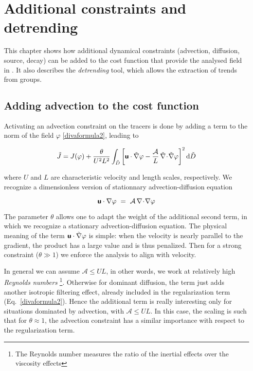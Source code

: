 \chapter{Additional constraints and detrending\label{chap:advection}}

This chapter shows how additional dynamical constraints (advection, diffusion, source, decay) can be added to the cost function that provide the analysed field in \diva. It also describes the \textit{detrending} tool, which allows the extraction of trends from groups.

\minitoc


\section{Adding advection to the cost function}

Activating an advection constraint on the tracers is done by adding a term to the norm of the field $\varphi$ \eqref{divaformula2}, leading to

\begin{equation}
\tilde{J}= J(\varphi) + \frac{\theta}{U^2 L^2} \int_{\tilde{D}}\left[
\mbox{\boldmath $ \protect\mathsf{u} $} \cdot \tilde{\nabla} \varphi
- \frac{\mathcal{A}}{L} \, \tilde{\nabla}\! \cdot\! \tilde{\nabla}\varphi
\right]^2 \mbox{d} \tilde{D}
\end{equation}

where $U$ and $L$ are characteristic velocity and length scales, respectively. We recognize a dimensionless version of stationnary advection-diffusion equation

\begin{equation}
\mbox{\boldmath $ \protect\mathsf{u} $} \cdot {\nabla} \varphi
~=~ \mathcal{A}  \, {\nabla}\! \cdot\! {\nabla}\varphi 
\end{equation}

The parameter $\theta$ allows one to adapt the weight of the additional second term, in which we recognize a stationary advection-diffusion equation. The physical meaning of the term $\mbox{\boldmath $ \protect\mathsf{u} $} \cdot \tilde{\nabla} \varphi$ is simple: when the velocity is nearly parallel to the gradient, the product has a large value and is thus penalized. Then for a strong constraint ($\theta\gg 1$) we enforce the analysis to align with velocity.

In general we can assume $\mathcal{A} \le U L$, in other words, we work at relatively high \textit{Reynolds numbers} \footnote{The Reynolds number measures the ratio of the inertial effects over the viscosity effects}. Otherwise for dominant diffusion, the term just adds another isotropic filtering effect, already included in the regularization term (Eq.~\ref{divaformula2}). Hence the additional term is really interesting only for situations dominated by advection, with $\mathcal{A} \le U L$. In this case, the scaling is such that for $\theta\approx 1$, the advection constraint has a similar importance with respect to the regularization term.

